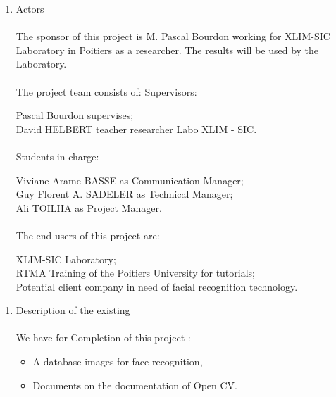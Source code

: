 \begin{enumerate}
	\item Actors\paragraph{} 
The sponsor of this project is M. Pascal Bourdon working for XLIM-SIC Laboratory in Poitiers as a researcher. The results will be used by the Laboratory.\paragraph{}
The project team consists of:
Supervisors:
\begin{center}
Pascal Bourdon supervises;\\
David HELBERT teacher researcher Labo XLIM - SIC.\paragraph{}
\end{center}

Students in charge:
\begin{center}
Viviane Arame BASSE as Communication Manager;\\
Guy Florent A. SADELER as Technical Manager;\\
Ali TOILHA as Project Manager.\paragraph{}
\end{center}

The end-users of this project are:
\begin{center}
XLIM-SIC Laboratory;\\
RTMA Training of the Poitiers University for tutorials;\\
Potential client company in need of facial recognition technology.\vspace{0.5cm}
\end{center}

\end{enumerate}

\begin{enumerate}
	\item Description of the existing \paragraph{}

We have for Completion of this project :
\begin{itemize}
	\item A database images for face recognition,
	\item Documents on the documentation of Open CV. \vspace{0.5cm}
\end{itemize}

\end{enumerate}



